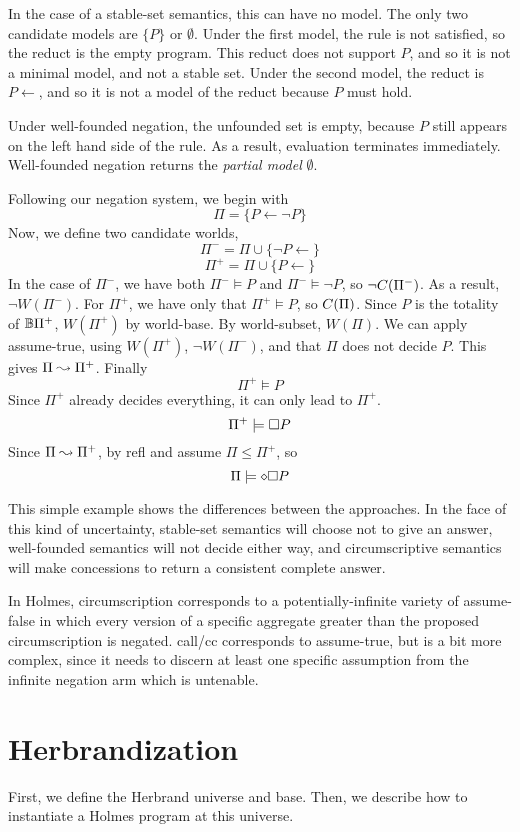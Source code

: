 In the case of a stable-set semantics, this can have no model.
The only two candidate models are $\{P\}$ or $\emptyset$.
Under the first model, the rule is not satisfied, so the reduct is the empty program.
This reduct does not support $P$, and so it is not a minimal model, and not a stable set.
Under the second model, the reduct is $P \leftarrow$, and so it is not a model of the reduct because $P$ must hold.

Under well-founded negation, the unfounded set is empty, because $P$ still appears on the left hand side of the rule.
As a result, evaluation terminates immediately.
Well-founded negation returns the \emph{partial model} $\emptyset$.

Following our negation system, we begin with
\[\Pi = \{P \leftarrow \neg P\}\]
Now, we define two candidate worlds,
\[\Pi^- = \Pi \cup \{\neg P \leftarrow\}\]
\[\Pi^+ = \Pi \cup \{P \leftarrow\}\]
In the case of $\Pi^-$, we have both $\Pi^- \models P$ and $\Pi^- \models \neg P$, so $\neg C(\Pi^-)$.
As a result, $\neg W(\Pi^-)$.
For $\Pi^+$, we have only that $\Pi^+ \models P$, so $C(\Pi)$.
Since $P$ is the totality of $\mathbb{B}{\Pi^+}$, $W(\Pi^+)$ by world-base.
By world-subset, $W(\Pi)$.
We can apply assume-true, using $W(\Pi^+)$, $\neg W(\Pi^-)$, and that $\Pi$ does not decide $P$.
This gives $\Pi \leadsto \Pi^+$.
Finally
\[
	\Pi^+ \models P
\]
Since $\Pi^+$ already decides everything, it can only lead to $\Pi^+$.
\[
	\Pi^+ \models \square P
\]
Since $\Pi \leadsto \Pi^+$, by refl and assume $\Pi \leq \Pi^+$, so
\[
	\Pi \models \diamond \square P
\]

This simple example shows the differences between the approaches.
In the face of this kind of uncertainty, stable-set semantics will choose not to give an answer, well-founded semantics will not decide either way, and circumscriptive semantics will make concessions to return a consistent complete answer. 

In Holmes, circumscription corresponds to a potentially-infinite variety of assume-false in which every version of a specific aggregate greater than the proposed circumscription is negated.
call/cc corresponds to assume-true, but is a bit more complex, since it needs to discern at least one specific assumption from the infinite negation arm which is untenable.

\section{Herbrandization}
\label{formal:sec:herbrand}
First, we define the Herbrand universe and base.
Then, we describe how to instantiate a Holmes program at this universe.

